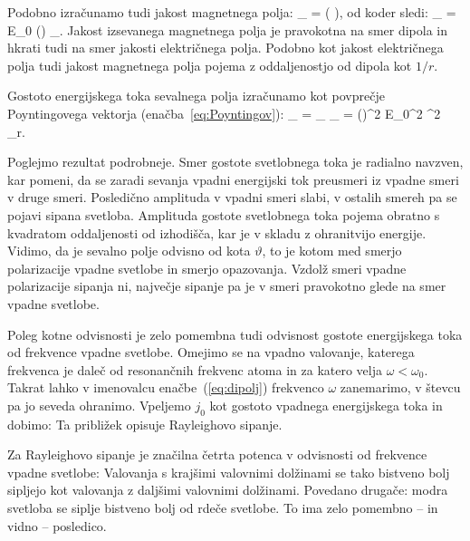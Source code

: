 Podobno izračunamo tudi jakost magnetnega polja:
\beq
{}_ = 
\left( \times {}\right)\!\!,
\label{eq:07_13}
\eeq
od koder sledi: 
\beq
{}_ = 
E_0\sin \vartheta
\left(\right) _\varphi.
\label{eq:dipolH}
\eeq
Jakost izsevanega magnetnega polja je pravokotna na smer dipola in 
hkrati tudi na smer jakosti električnega polja. Podobno kot jakost
električnega polja tudi jakost magnetnega polja pojema z oddaljenostjo
od dipola kot $1/r$. 

Gostoto energijskega toka sevalnega polja izračunamo kot povprečje 
Poyntingovega vektorja (enačba~\ref{eq:Poyntingov}):
\beq
{}_ = \langle {}_
\times {}_  \rangle 
= 
\left(\right)^2
E_0^2 \sin^2 \vartheta \,_r.
\label{eq:dipolj}
\eeq

Poglejmo rezultat podrobneje. Smer gostote svetlobnega toka je radialno navzven, 
kar pomeni, da se zaradi sevanja vpadni energijski tok preusmeri iz vpadne smeri
v druge smeri. Posledično amplituda v vpadni smeri slabi, v ostalih smereh pa se 
pojavi sipana svetloba. Amplituda gostote svetlobnega toka 
pojema obratno s kvadratom oddaljenosti od izhodišča, kar je v skladu
z ohranitvijo energije. Vidimo, da je sevalno polje odvisno od kota $\vartheta$,
to je kotom med smerjo polarizacije vpadne svetlobe in smerjo opazovanja. Vzdolž
smeri vpadne polarizacije sipanja ni, največje sipanje pa je v smeri pravokotno glede
na smer vpadne svetlobe.

Poleg kotne odvisnosti je zelo pomembna tudi odvisnost gostote energijskega toka
od frekvence vpadne svetlobe. Omejimo se na vpadno valovanje, katerega frekvenca 
je daleč od resonančnih frekvenc atoma in za katero velja $\omega <\omega_0$. Takrat
lahko v imenovalcu enačbe~(\ref{eq:dipolj}) frekvenco $\omega$ zanemarimo, v števcu
pa jo seveda ohranimo. Vpeljemo $j_0$ kot gostoto vpadnega energijskega toka in dobimo:
Ta približek opisuje Rayleighovo sipanje. 

Za Rayleighovo sipanje je značilna četrta potenca v odvisnosti od frekvence 
vpadne svetlobe:
Valovanja s krajšimi valovnimi dolžinami se tako bistveno bolj sipljejo kot valovanja 
z daljšimi valovnimi dolžinami. Povedano drugače: modra svetloba se siplje bistveno 
bolj od rdeče svetlobe. To ima zelo pomembno -- in vidno -- posledico.

